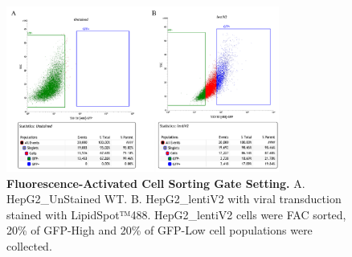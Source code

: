 \documentclass[
  a4paper,
]{article}
\newenvironment{fignos:tagged-figure}[1][]{
  \let\oldfigurename\figurename
  \renewcommand{\figurename}{Supplementary Figure}
}{
  \let\figurename\oldfigurename
}
\begin{document}
\begin{fignos:tagged-figure}[S9]

\begin{figure}
\hypertarget{fig:sup:crispr:fig2}{%
\centering
\includegraphics[width=0.8\textwidth,height=\textheight]{images/crispr/figure2.png}
\caption{\textbf{Fluorescence-Activated Cell Sorting Gate Setting.}
A. HepG2\_UnStained WT.
B. HepG2\_lentiV2 with viral transduction stained with LipidSpot™488.
HepG2\_lentiV2 cells were FAC sorted, 20\% of GFP-High and 20\% of GFP-Low cell populations were collected.}\label{fig:sup:crispr:fig2}
}
\end{figure}

\end{fignos:tagged-figure}
\end{document}
